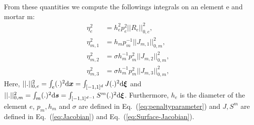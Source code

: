From these quantities we compute the followings integrals on an
element e and mortar m:
%
\begin{subequations}
\label{eq:Eta2_Integrals}
\begin{align}
\eta^{2}_{e} &= h^{2}_{e}p^{2}_{e}||R_{e}||^{2}_{0,e}, \\
\eta^{2}_{m,1} &= h_{m}p^{-1}_{m}||J_{m,1}||^{2}_{0,m }, \\
\eta^{2}_{m,2} &= \sigma h_{m}^{-1}p^{2}_{m}||J_{m,2}||^{2}_{0,m},\\
\eta^{2}_{m,3} &= \sigma h_{m}^{-1}p^{2}_{m}||J_{m,3}||^{2}_{0,m},
\end{align}
\end{subequations}
%
Here, $|| . ||^2_{0,e} = \int_e ( . )^2 \mathrm{d}\boldsymbol{x} = \int_{[-1,1]^d} J ( . )^2
\mathrm{d}\boldsymbol{\xi}$ and $|| . ||^2_{0,m} = \int_{m} ( . )^2 \mathrm{d} \boldsymbol{s} =
\int_{[-1,1]^{d-1}}S^m ( . )^2 \mathrm{d}\boldsymbol{\xi}$.
  Furthermore, $h_e$ is the diameter of the element $e$, $p_m, h_m$
  and $\sigma$ are defined in Eq.~(\ref{eq:penaltyparameter}) and $J,S^m$ are defined in Eq.~(\ref{eq:Jacobian}) and Eq.~(\ref{eq:Surface-Jacobian}).
  
